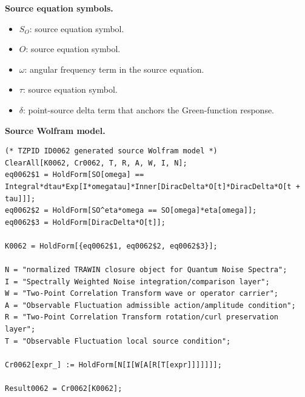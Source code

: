 \begin{minipage}[t]{0.49\linewidth}
\begingroup
\small
\raggedright
\textbf{Source equation symbols.}\par
\begin{itemize}[leftmargin=1.35em,itemsep=1pt,topsep=1pt,parsep=0pt]
    \item $S_{O}$: source equation symbol.
    \item $O$: source equation symbol.
    \item $\omega$: angular frequency term in the source equation.
    \item $\tau$: source equation symbol.
    \item $\delta$: point-source delta term that anchors the Green-function response.
\end{itemize}
\endgroup
\end{minipage}\hfill
\begin{minipage}[t]{0.47\linewidth}
\begingroup
\scriptsize
\raggedright
\textbf{Source Wolfram model.}\par
\begin{Verbatim}[fontsize=\tiny,breaklines=true,breakanywhere=true]
(* TZPID ID0062 generated source Wolfram model *)
ClearAll[K0062, Cr0062, T, R, A, W, I, N];
eq0062$1 = HoldForm[SO[omega] == Integral*dtau*Exp[I*omegatau]*Inner[DiracDelta*O[t]*DiracDelta*O[t + tau]]];
eq0062$2 = HoldForm[SO^eta*omega == SO[omega]*eta[omega]];
eq0062$3 = HoldForm[DiracDelta*O[t]];

K0062 = HoldForm[{eq0062$1, eq0062$2, eq0062$3}];

N = "normalized TRAWIN closure object for Quantum Noise Spectra";
I = "Spectrally Weighted Noise integration/comparison layer";
W = "Two-Point Correlation Transform wave or operator carrier";
A = "Observable Fluctuation admissible action/amplitude condition";
R = "Two-Point Correlation Transform rotation/curl preservation layer";
T = "Observable Fluctuation local source condition";

Cr0062[expr_] := HoldForm[N[I[W[A[R[T[expr]]]]]]];

Result0062 = Cr0062[K0062];
\end{Verbatim}
\endgroup
\end{minipage}

